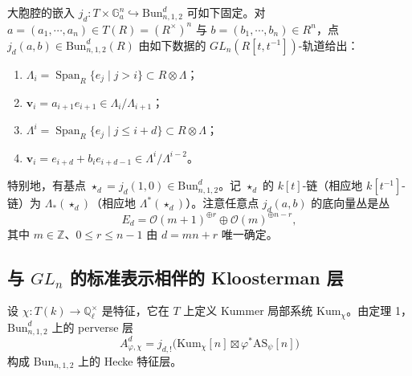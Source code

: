 大胞腔的嵌入 $j_d:T\times\mathbb{G}_a^n\hookrightarrow\mathrm{Bun}^d_{n,1,2}$ 可如下固定。对 $a=(a_1,\cdots,a_n)\in T(R)=(R^\times)^n$ 与 $b=(b_1,\cdots,b_n)\in R^n$，点 $j_d(a,b)\in\mathrm{Bun}^d_{n,1,2}(R)$ 由如下数据的 $GL_n(R[t,t^{-1}])$-轨道给出：
\begin{enumerate}[label=(\arabic*), leftmargin=1.9em, itemsep=.15em]
\item $\Lambda_i=\operatorname{Span}_R\{e_j\mid j>i\}\subset R\otimes\Lambda$；
\item $\mathbf v_i=a_{i+1}e_{i+1}\in\Lambda_i/\Lambda_{i+1}$；
\item $\Lambda^i=\operatorname{Span}_R\{e_j\mid j\le i+d\}\subset R\otimes\Lambda$；
\item $\mathbf v_i=e_{i+d}+b_ie_{i+d-1}\in\Lambda^i/\Lambda^{i-2}$。
\end{enumerate}
特别地，有基点 $\star_d=j_d(1,0)\in\mathrm{Bun}^d_{n,1,2}$。记 $\star_d$ 的 $k[t]$-链（相应地 $k[t^{-1}]$-链）为 $\Lambda_*(\star_d)$（相应地 $\Lambda^*(\star_d)$）。注意任意点 $j_d(a,b)$ 的底向量丛是丛
\[
E_d=\mathcal O(m+1)^{\oplus r}\oplus\mathcal O(m)^{\oplus n-r},
\]
其中 $m\in\mathbb{Z}$、$0\le r\le n-1$ 由 $d=mn+r$ 唯一确定。

\subsection{与 $GL_n$ 的标准表示相伴的 Kloosterman 层}

设 $\chi:T(k)\to\mathbb{Q}_\ell^\times$ 是特征，它在 $T$ 上定义 Kummer 局部系统 $\mathrm{Kum}_\chi$。由定理 1，$\mathrm{Bun}^d_{n,1,2}$ 上的 perverse 层
\[
A_{\varphi,\chi}^d=j_{d,!}\big(\mathrm{Kum}_\chi[n]\boxtimes\varphi^*\mathrm{AS}_\psi[n]\big)
\]
构成 $\mathrm{Bun}_{n,1,2}$ 上的 Hecke 特征层。


